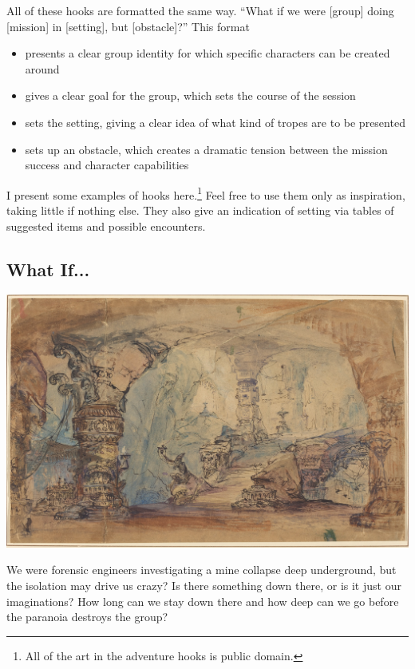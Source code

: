 \documentclass[a4,landscape]{book}
\begin{document}
\begin{multicols*}{4}
All of these hooks are formatted the same way.
``What if we were [group] doing [mission] in [setting], but [obstacle]?''
This format

\begin{itemize}
\item presents a clear group identity for which specific characters can be created around
\item gives a clear goal for the group, which sets the course of the session
\item sets the setting, giving a clear idea of what kind of tropes are to be presented
\item sets up an obstacle, which creates a dramatic tension between the mission success and character capabilities
\end{itemize}

I present some examples of hooks here.\footnote{All of the art in the adventure hooks is public domain.}
Feel free to use them only as inspiration, taking little if nothing else.
They also give an indication of setting via tables of suggested items and possible encounters.

\subsection*{What If...}

\includegraphics[width=\columnwidth]{./fantastic_cave}

We were forensic engineers investigating a mine collapse deep underground, but the isolation may drive us crazy?
Is there something down there, or is it just our imaginations?
How long can we stay down there and how deep can we go before the paranoia destroys the group? \\


\end{multicols*}
\end{document}
